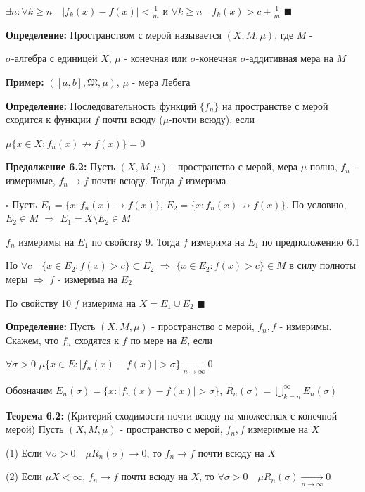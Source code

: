 \documentclass[a4paper]{report}
\begin{document}
$\exists n\colon\forall k\ge n\quad|f_k(x)-f(x)|<\frac1m$ и $\forall k\ge n\quad f_k(x)>c+\frac1m$ $\blacksquare$
\bigskip

\noindent\textbf{Определение:} Пространством с мерой называется $(X,M,\mu)$, где $M$ -

$\sigma$-алгебра с единицей $X$, $\mu$ - конечная или $\sigma$-конечная $\sigma$-аддитивная мера на $M$
\bigskip

\noindent\textbf{Пример:} $([a,b],\mathfrak M,\mu)$, $\mu$ - мера Лебега
\bigskip

\noindent\textbf{Определение:} Последовательность функций $\{f_n\}$ на пространстве с мерой сходится к функции $f$ почти всюду ($\mu$-почти всюду), если

$\mu\{x\in X\colon f_n(x)\nrightarrow f(x)\}=0$
\bigskip

\noindent\textbf{Предолжение 6.2:} Пусть $(X,M,\mu)$ - пространство с мерой, мера $\mu$ полна, $f_n$ - измеримые, $f_n\to f$ почти всюду. Тогда $f$ измерима

\noindent $\square$ Пусть $E_1=\{x\colon f_n(x)\to f(x)\}$, $E_2=\{x\colon f_n(x)\nrightarrow f(x)\}$. По условию, $E_2\in M$ $\Rightarrow$ $E_1=X\setminus E_2\in M$

$f_n$ измеримы на $E_1$ по свойству 9. Тогда $f$ измерима на $E_1$ по предположению 6.1

Но $\forall c\quad\{x\in E_2\colon f(x)>c\}\subset E_2$ $\Rightarrow$ $\{x\in E_2\colon f(x)>c\}\in M$ в силу полноты меры $\Rightarrow$ $f$ - измерима на $E_2$

По свойству 10 $f$ измерима на $X=E_1\cup E_2$ $\blacksquare$
\bigskip

\noindent\textbf{Определение:} Пусть $(X,M,\mu)$ - пространство с мерой, $f_n,f$ - измеримы. Скажем, что $f_n$ сходятся к $f$ по мере на $E$, если

$\forall\sigma>0$ $\mu\{x\in E\colon|f_n(x)-f(x)|>\sigma\}\xrightarrow[n\to\infty]{}0$

Обозначим $E_n(\sigma)=\{x\colon|f_n(x)-f(x)|>\sigma\}$, $R_n(\sigma)=\bigcup\limits_{k=n}^\infty E_n(\sigma)$
\bigskip

\noindent\textbf{Теорема 6.2:} (Критерий сходимости почти всюду на множествах с конечной мерой) Пусть $(X,M,\mu)$ - пространство с мерой, $f_n,f$ измеримые на $X$

(1) Если $\forall\sigma>0\quad\mu R_n(\sigma)\to0$, то $f_n\to f$ почти всюду на $X$

(2) Если $\mu X<\infty$, $f_n\to f$ почти всюду на $X$, то $\forall\sigma>0\quad\mu R_n(\sigma)\xrightarrow[n\to\infty]{}0$
\end{document}
